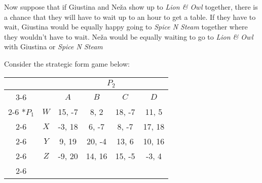 \documentclass[addpoints, answers]{exam}
\newcounter{BoSparts}
\begin{document}
\begin{questions}
\begin{parts}
  \setcounter{BoSparts}{\value{partno}}
  
\end{parts}

\newpage

Now suppose that if Giustina and Ne\v{z}a show up to \textit{Lion \& Owl} together,
there is a chance that they will have to wait up to an hour to get a table.
If they have to wait, Giustina would be equally happy going to \textit{Spice N Steam} 
together where they wouldn't have to wait. 
Ne\v{z}a would be equally waiting to go to \textit{Lion \& Owl} with Giustina
or \textit{Spice N Steam}
  

\newpage

\question%

Consider the strategic form game below:

\begin{table}[!h]
  \begin{center}
    \begin{tabular}{*{6}{c|}}
      \multicolumn{2}{c}{} & \multicolumn{4}{c}{$P_2$} \\ \cline{3-6}
      \multicolumn{1}{c}{} &  & $A$ & $B$ & $C$ & $D$ \\ \cline{2-6} 
      \multirow{4}*{$P_1$}
      & $W$ & 15, -7 &  8,  2 & 18, -7 & 11,  5 \\ \cline{2-6}
      & $X$ & -3, 18 &  6, -7 &  8, -7 & 17, 18 \\ \cline{2-6} 
      & $Y$ &  9, 19 & 20, -4 & 13,  6 & 10, 16 \\ \cline{2-6} 
      & $Z$ & -9, 20 & 14, 16 & 15, -5 & -3,  4 \\ \cline{2-6} 
  \end{tabular}
  \end{center}
\end{table}


\end{questions}
\end{document}
